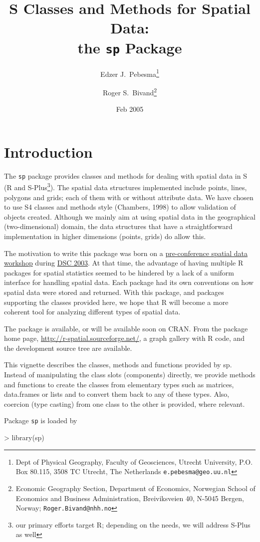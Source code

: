 \documentclass{article}
\title{ S Classes and Methods for Spatial Data:\\
the {\tt sp} Package }
\author{Edzer J.\ Pebesma\footnote{Dept of Physical Geography,
Faculty of Geosciences, Utrecht University, P.O. Box 80.115,
3508 TC Utrecht, The Netherlands {\tt e.pebesma@geo.uu.nl}} \and 
Roger S.\ Bivand\footnote{Economic Geography Section, Department of Economics, %
Norwegian School of Economics and Business Administration, %
Breiviksveien 40, N-5045 Bergen, Norway; {\tt Roger.Bivand@nhh.no}}}
\date{Feb 2005}
\begin{document}
\maketitle
\tableofcontents

\section{Introduction}

The {\tt sp} package provides classes and methods for dealing with
spatial data in S (R and S-Plus\footnote{our primary efforts target R;
depending on the needs, we will address S-Plus as well}). The spatial
data structures implemented include points, lines, polygons and grids;
each of them with or without attribute data.  We have chosen to use S4
classes and methods style (Chambers, 1998) to allow validation of objects
created. Although we mainly aim at using spatial data in the geographical
(two-dimensional) domain, the data structures that have a straightforward
implementation in higher dimensions (points, grids) do allow this.

The motivation to write this package was born on a
\href{http://spatial.nhh.no/meetings/vienna/index.html}{pre-conference
spatial data workshop} during
\href{http://www.ci.tuwien.ac.at/Conferences/DSC-2003/}{DSC 2003}.
At that time, the advantage of having multiple R packages for spatial
statistics seemed to be hindered by a lack of a uniform interface for
handling spatial data. Each package had its own conventions on how
spatial data were stored and returned. With this package, and packages
supporting the classes provided here, we hope that R will become a more
coherent tool for analyzing different types of spatial data.

The package is available, or will be available soon on CRAN. From the
package home page, \url{http://r-spatial.sourceforge.net/}, a graph
gallery with R code, and the development source tree are available.

This vignette describes the classes, methods and functions provided
by sp. Instead of manipulating the class slots (components) directly,
we provide methods and functions to create the classes from elementary
types such as matrices, data.frames or lists and to convert them back
to any of these types. Also, coercion (type casting) from one class to
the other is provided, where relevant.

Package {\tt sp} is loaded by 
\begin{Schunk}
\begin{Sinput}
> library(sp)
\end{Sinput}
\end{Schunk}
\end{document}
